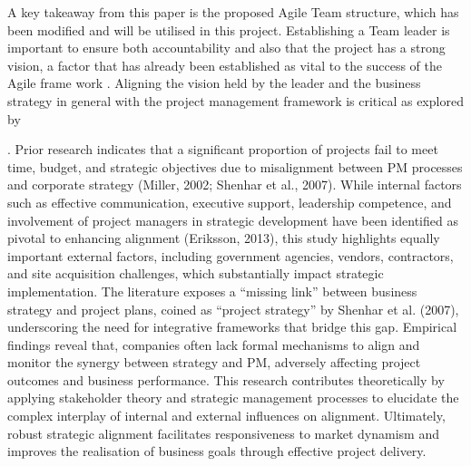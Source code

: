 \documentclass{report}
\begin{document}
A key takeaway from this paper is the proposed Agile Team structure, which has been modified and will be utilised in this project. Establishing a Team leader is important to ensure both accountability and also that the project has a strong vision, a factor that has already been established as vital to the success of the Agile frame work \parencite{serradorDoesAgileWork2015}. Aligning the vision held by the leader and the business strategy in general with the project management framework is critical as explored by \author{alsudiriAlignmentLargeProject2013}. Prior research indicates that a significant proportion of projects fail to meet time, budget, and strategic objectives due to misalignment between PM processes and corporate strategy (Miller, 2002; Shenhar et al., 2007). While internal factors such as effective communication, executive support, leadership competence, and involvement of project managers in strategic development have been identified as pivotal to enhancing alignment (Eriksson, 2013), this study highlights equally important external factors, including government agencies, vendors, contractors, and site acquisition challenges, which substantially impact strategic implementation. The literature exposes a “missing link” between business strategy and project plans, coined as “project strategy” by Shenhar et al. (2007), underscoring the need for integrative frameworks that bridge this gap. Empirical findings reveal that, companies often lack formal mechanisms to align and monitor the synergy between strategy and PM, adversely affecting project outcomes and business performance. This research contributes theoretically by applying stakeholder theory and strategic management processes to elucidate the complex interplay of internal and external influences on alignment. Ultimately, robust strategic alignment facilitates responsiveness to market dynamism and improves the realisation of business goals through effective project delivery. 
\end{document}
